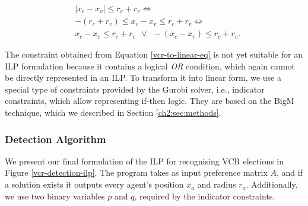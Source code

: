 \begin{equation}\label{vcr-to-linear-eq}
    \begin{split}
     & |x_c - x_v| \leq r_c + r_v \iff \\
     & -(r_c + r_v) \le x_c - x_v \le r_c + r_v \iff \\
     & x_c - x_v \le r_c + r_v\ \ \lor \ \ -(x_c - x_v) \le r_c + r_v.
    \end{split}
\end{equation}

The constraint obtained from Equation \ref{vcr-to-linear-eq} is not yet suitable for an ILP formulation
because it contains a logical \textit{OR} condition, which again cannot be directly represented in an ILP.
To transform it into linear form, we use a special type of constraints provided by the Gurobi solver, i.e., indicator constraints,
which allow representing if-then logic.
They are based on the BigM technique, which we described in Section \ref{ch2:sec:methods}.

\subsubsection{Detection Algorithm} \label{vcr-detection-ilp-section}
We present our final formulation of the ILP for recognising VCR elections in Figure \ref{vcr-detection-ilp}.
The program takes as input preference matrix $A$,
and if a solution exists it outputs every agent's position $x_a$ and radius $r_a$.
Additionally, we use two binary variables $p$ and $q$, required by the indicator constraints.

